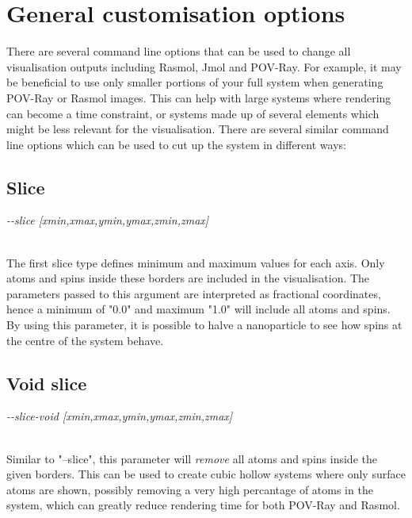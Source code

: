 \section*{General customisation options}

There are several command line options that can be used to change all visualisation outputs including Rasmol, Jmol and POV-Ray. For example, it may be beneficial to use only smaller portions of your full system when generating POV-Ray or Rasmol images. This can help with large systems where rendering can become a time constraint, or systems made up of several elements which might be less relevant for the visualisation. There are several similar command line options which can be used to cut up the system in different ways:

\subsection*{Slice}

\begin{minipage}[c]{\textwidth}
\centering
\textit{-{}-slice [xmin,xmax,ymin,ymax,zmin,zmax]}
\end{minipage}\\

The first slice type defines minimum and maximum values for each axis. Only atoms and spins inside these borders are included in the visualisation. The parameters passed to this argument are interpreted as fractional coordinates, hence a minimum of "0.0" and maximum "1.0" will include all atoms and spins. \\

By using this parameter, it is possible to halve a nanoparticle to see how spins at the centre of the system behave.\\

\subsection*{Void slice}

\begin{minipage}[c]{\textwidth}
\centering
\textit{-{}-slice-void [xmin,xmax,ymin,ymax,zmin,zmax]}
\end{minipage}\\

Similar to "--slice", this parameter will \textit{remove} all atoms and spins inside the given borders. This can be used to create cubic hollow systems where only surface atoms are shown, possibly removing a very high percantage of atoms in the system, which can greatly reduce rendering time for both POV-Ray and Rasmol. \\

